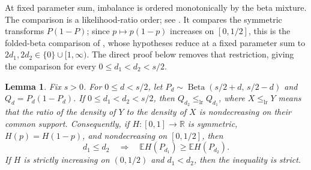 \documentclass[11pt,a4paper]{amsart}
\numberwithin{equation}{section}
\theoremstyle{plain}
\newtheorem{lemma}[theorem]{Lemma}
\theoremstyle{definition}
\newcommand{\E}{\mathbb E}
\begin{document}
At fixed parameter sum, imbalance is ordered monotonically by the beta mixture.  The
comparison is a likelihood-ratio order; see
\cite[\S1.C]{ShakedShanthikumar2007StochasticOrders}.  It compares the symmetric
transforms \(P(1-P)\); since \(p\mapsto p(1-p)\) increases on \([0,1/2]\), this
is the folded-beta comparison of
\cite[Thm.~3]{BerenhautBergen2011StochasticOrderings}, whose hypotheses reduce at a
fixed parameter sum to
\(2d_1,2d_2\in\{0\}\cup[1,\infty)\).  The direct proof below removes that
restriction, giving the comparison for every \(0\le d_1<d_2<s/2\).

\begin{lemma}\label{lem:beta-order}
Fix \(s>0\).  For \(0\le d<s/2\), let
\(P_d\sim\operatorname{Beta}(s/2+d,\,s/2-d)\) and \(Q_d=P_d(1-P_d)\).  If
\(0\le d_1<d_2<s/2\), then \(Q_{d_2}\le_{\mathrm{lr}}Q_{d_1}\), where
\(X\le_{\mathrm{lr}}Y\) means that the ratio of the density of \(Y\) to the
density of \(X\) is nondecreasing on their common support.
Consequently, if \(H:[0,1]\to\mathbb R\) is symmetric, \(H(p)=H(1-p)\), and nondecreasing on
\([0,1/2]\), then
\begin{equation}\label{eq:beta-order}
 d_1\le d_2
 \quad\Longrightarrow\quad
 \E H(P_{d_1})\ge \E H(P_{d_2}).
\end{equation}
If \(H\) is strictly increasing on \((0,1/2)\) and \(d_1<d_2\), then the inequality
is strict.
\end{lemma}
\end{document}
